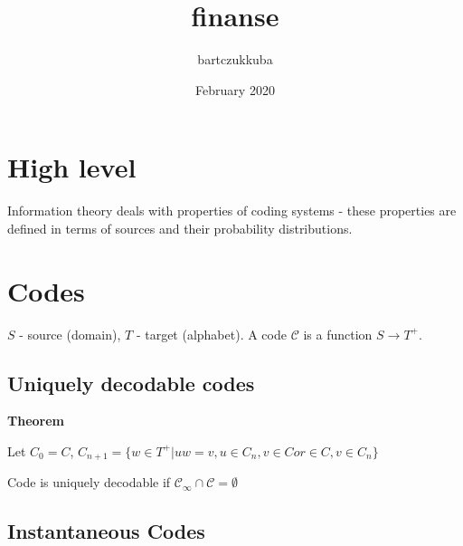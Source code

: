 \documentclass{article}
\title{finanse}
\author{bartczukkuba }
\date{February 2020}
\begin{document}
\section{High level}

Information theory deals with properties of coding systems - these properties are defined in terms of sources and their probability distributions.

\section{Codes}

$S$ - source (domain), $T$ - target (alphabet). A code $\mathcal{C}$ is a function $S \to T^+$.

\subsection{Uniquely decodable codes}

\textbf{Theorem}

Let $C_0 = C$, $C_{n+1} = \{w \in T^+ | uw = v, u \in C_n, v \in C or \in C, v \in C_n \}$

Code is uniquely decodable if $\mathcal{C}_\infty \cap \mathcal{C} = \emptyset$

\subsection{Instantaneous Codes}
\end{document}
